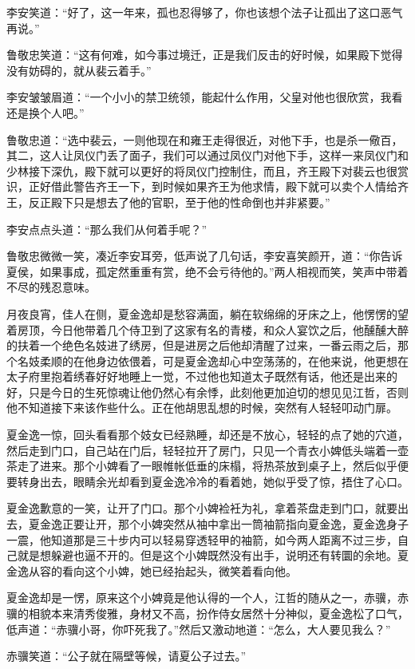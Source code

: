 李安笑道：“好了，这一年来，孤也忍得够了，你也该想个法子让孤出了这口恶气再说。”

鲁敬忠笑道：“这有何难，如今事过境迁，正是我们反击的好时候，如果殿下觉得没有妨碍的，就从裴云着手。”

李安皱皱眉道：“一个小小的禁卫统领，能起什么作用，父皇对他也很欣赏，我看还是换个人吧。”

鲁敬忠道：“选中裴云，一则他现在和雍王走得很近，对他下手，也是杀一儆百，其二，这人让凤仪门丢了面子，我们可以通过凤仪门对他下手，这样一来凤仪门和少林接下深仇，殿下就可以更好的将凤仪门控制住，而且，齐王殿下对裴云也很赏识，正好借此警告齐王一下，到时候如果齐王为他求情，殿下就可以卖个人情给齐王，反正殿下只是想去了他的官职，至于他的性命倒也并非紧要。”

李安点点头道：“那么我们从何着手呢？”

鲁敬忠微微一笑，凑近李安耳旁，低声说了几句话，李安喜笑颜开，道：“你告诉夏侯，如果事成，孤定然重重有赏，绝不会亏待他的。”两人相视而笑，笑声中带着不尽的残忍意味。

月夜良宵，佳人在侧，夏金逸却是愁容满面，躺在软绵绵的牙床之上，他愣愣的望着房顶，今日他带着几个侍卫到了这家有名的青楼，和众人宴饮之后，他醺醺大醉的扶着一个绝色名妓进了绣房，但是进房之后他却清醒了过来，一番云雨之后，那个名妓柔顺的在他身边依偎着，可是夏金逸却心中空荡荡的，在他来说，他更想在太子府里抱着绣春好好地睡上一觉，不过他也知道太子既然有话，他还是出来的好，只是今日的生死惊魂让他仍然心有余悸，此刻他更加迫切的想见见江哲，否则他不知道接下来该作些什么。正在他胡思乱想的时候，突然有人轻轻叩动门扉。

夏金逸一惊，回头看看那个妓女已经熟睡，却还是不放心，轻轻的点了她的穴道，然后走到门口，自己站在门后，轻轻拉开了房门，只见一个青衣小婢低头端着一壶茶走了进来。那个小婢看了一眼帷帐低垂的床榻，将热茶放到桌子上，然后似乎便要转身出去，眼睛余光却看到夏金逸冷冷的看着她，她似乎受了惊，捂住了心口。

夏金逸歉意的一笑，让开了门口。那个小婢裣衽为礼，拿着茶盘走到门口，就要出去，夏金逸正要让开，那个小婢突然从袖中拿出一筒袖箭指向夏金逸，夏金逸身子一震，他知道那是三十步内可以轻易穿透轻甲的袖箭，如今两人距离不过三步，自己就是想躲避也逼不开的。但是这个小婢既然没有出手，说明还有转圜的余地。夏金逸从容的看向这个小婢，她已经抬起头，微笑着看向他。

夏金逸却是一愣，原来这个小婢竟是他认得的一个人，江哲的随从之一，赤骥，赤骥的相貌本来清秀俊雅，身材又不高，扮作侍女居然十分神似，夏金逸松了口气，低声道：“赤骥小哥，你吓死我了。”然后又激动地道：“怎么，大人要见我么？”

赤骥笑道：“公子就在隔壁等候，请夏公子过去。”

